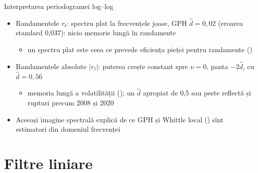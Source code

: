 \begin{frame}{Interpretarea periodogramei log--log}
\itemsize{\small}
\begin{itemize}
    \item Randamentele $r_t$: spectru plat la frecvențele joase, GPH $\hat d = 0{,}02$ (eroarea standard 0{,}037): nicio memorie lungă în randamente
    \begin{itemize}
        \item un spectru plat este ceea ce prevede eficiența pieței pentru randamente ()
    \end{itemize}
    \item Randamentele absolute $|r_t|$: puterea crește constant spre $\nu = 0$, panta $-2\hat d$, cu $\hat d = 0{,}56$
    \begin{itemize}
        \item memoria lungă a volatilității (); un $\hat d$ apropiat de 0,5 sau peste reflectă și rupturi precum 2008 și 2020
    \end{itemize}
    \item Aceeași imagine spectrală explică de ce GPH și Whittle local () sînt estimatori din domeniul frecvenței
\end{itemize}
\end{frame}


\section{Filtre liniare}

